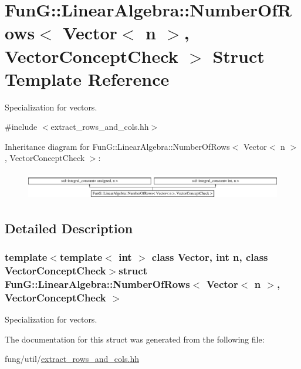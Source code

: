 \hypertarget{structFunG_1_1LinearAlgebra_1_1NumberOfRows_3_01Vector_3_01n_01_4_00_01VectorConceptCheck_01_4}{\section{\-Fun\-G\-:\-:\-Linear\-Algebra\-:\-:\-Number\-Of\-Rows$<$ \-Vector$<$ n $>$, \-Vector\-Concept\-Check $>$ \-Struct \-Template \-Reference}
\label{structFunG_1_1LinearAlgebra_1_1NumberOfRows_3_01Vector_3_01n_01_4_00_01VectorConceptCheck_01_4}
}


\-Specialization for vectors.  




{\ttfamily \#include $<$extract\-\_\-rows\-\_\-and\-\_\-cols.\-hh$>$}

\-Inheritance diagram for \-Fun\-G\-:\-:\-Linear\-Algebra\-:\-:\-Number\-Of\-Rows$<$ \-Vector$<$ n $>$, \-Vector\-Concept\-Check $>$\-:\begin{figure}[H]
\begin{center}
\leavevmode
\includegraphics[height=1.230769cm]{structFunG_1_1LinearAlgebra_1_1NumberOfRows_3_01Vector_3_01n_01_4_00_01VectorConceptCheck_01_4}
\end{center}
\end{figure}


\subsection{\-Detailed \-Description}
\subsubsection*{template$<$template$<$ int $>$ class \-Vector, int n, class Vector\-Concept\-Check$>$struct Fun\-G\-::\-Linear\-Algebra\-::\-Number\-Of\-Rows$<$ Vector$<$ n $>$, Vector\-Concept\-Check $>$}

\-Specialization for vectors. 

\-The documentation for this struct was generated from the following file\-:\begin{DoxyCompactItemize}
\item 
fung/util/\hyperlink{extract__rows__and__cols_8hh}{extract\-\_\-rows\-\_\-and\-\_\-cols.\-hh}\end{DoxyCompactItemize}
